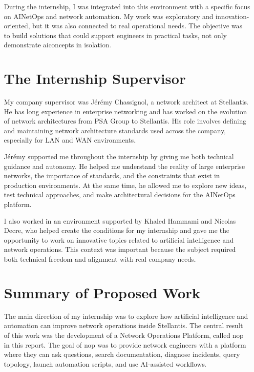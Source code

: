 \documentclass[11pt,a4paper]{report}
\begin{document}
During the internship, I was integrated into this environment with a specific focus on \gls{AINetOps} and network automation. My work was exploratory and innovation-oriented, but it was also connected to real operational needs. The objective was to build solutions that could support engineers in practical tasks, not only demonstrate \gls{ai}concepts in isolation.

\section{The Internship Supervisor}

My company supervisor was Jérémy Chassignol, a network architect at Stellantis. He has long experience in enterprise networking and has worked on the evolution of network architectures from PSA Group to Stellantis. His role involves defining and maintaining network architecture standards used across the company, especially for LAN and WAN environments.

Jérémy supported me throughout the internship by giving me both technical guidance and autonomy. He helped me understand the reality of large enterprise networks, the importance of standards, and the constraints that exist in production environments. At the same time, he allowed me to explore new ideas, test technical approaches, and make architectural decisions for the \gls{AINetOps} platform.

I also worked in an environment supported by Khaled Hammami and Nicolas Decre, who helped create the conditions for my internship and gave me the opportunity to work on innovative topics related to artificial intelligence and network operations. This context was important because the subject required both technical freedom and alignment with real company needs.

\section{Summary of Proposed Work}

The main direction of my internship was to explore how artificial intelligence and automation can improve network operations inside Stellantis. The central result of this work was the development of a Network Operations Platform, called  \gls{nop}  in this report. The goal of  \gls{nop}  was to provide network engineers with a platform where they can ask questions, search documentation, diagnose incidents, query topology, launch automation scripts, and use AI-assisted workflows.
\end{document}
